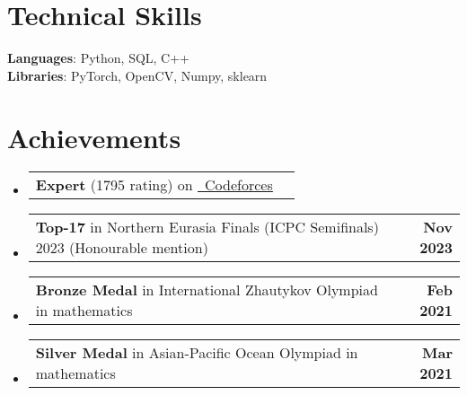 \documentclass[letterpaper,11pt]{article}
\makeatletter
\newcommand{\resumeProjectHeading}[2]{
    \item
    \begin{tabular*}{1.001\textwidth}{l@{\extracolsep{\fill}}r}
      \small#1 & \textbf{\small #2}\\
    \end{tabular*}\vspace{-7pt}
}
\newcommand{\resumeSubHeadingListStart}{\begin{itemize}[leftmargin=0.0in, label={}]}
\newcommand{\resumeSubHeadingListEnd}{\end{itemize}}
\makeatother
\begin{document}
\section{Technical Skills}
 \begin{itemize}[leftmargin=0.15in, label={}]
    \small{\item{
     \textbf{Languages}: Python, SQL, C++ \\
     \textbf{Libraries}: PyTorch, OpenCV, Numpy, sklearn\\
    }}
 \end{itemize}
 \vspace{-16pt}

\section{Achievements}
\vspace{-5pt}
    \resumeSubHeadingListStart
        \resumeProjectHeading
            {\textbf{Expert} (1795 rating) on \href{https://codeforces.com/profile/MVL_}{\raisebox{-0.2\height}\
            \underline{Codeforces}} \emph{}}{}
            \vspace{-30pt}
        \resumeProjectHeading
            {\textbf{Top-17} in Northern Eurasia Finals (ICPC Semifinals) 2023 (Honourable mention)}
            {Nov 2023}
            \vspace{-30pt}
        \resumeProjectHeading
            {\textbf{Bronze Medal} in International Zhautykov Olympiad in mathematics \emph{}}{Feb 2021}
            \vspace{-30pt}
        \resumeProjectHeading
            {\textbf{Silver Medal} in Asian-Pacific Ocean Olympiad in mathematics \emph{}}{Mar 2021}
            \vspace{-30pt}
    \resumeSubHeadingListEnd
\vspace{-22pt}
\end{document}
